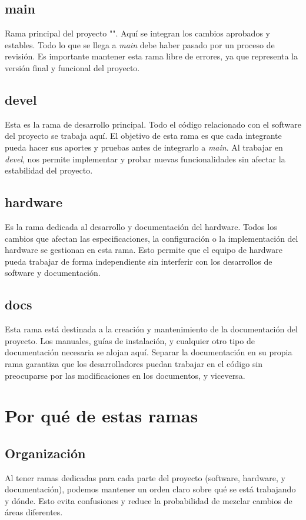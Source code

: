 \documentclass[a4paper]{article}
\begin{document}
    \subsection{main}
        \indent Rama principal del proyecto "". Aquí se integran los cambios aprobados y estables. Todo lo que se llega a \textit{main} debe haber pasado por un proceso de revisión. Es importante mantener esta rama libre de errores, ya que representa la versión final y funcional del proyecto.

    \subsection{devel}
        \indent Esta es la rama de desarrollo principal. Todo el código relacionado con el software del proyecto se trabaja aquí. El objetivo de esta rama es que cada integrante pueda hacer sus aportes y pruebas antes de integrarlo a \textit{main}. Al trabajar en \textit{devel}, nos permite implementar y probar nuevas funcionalidades sin afectar la estabilidad del proyecto.

    \subsection{hardware}
        \indent Es la rama dedicada al desarrollo y documentación del hardware. Todos los cambios que afectan las especificaciones, la configuración o la implementación del hardware se gestionan en esta rama. Esto permite que el equipo de hardware pueda trabajar de forma independiente sin interferir con los desarrollos de software y documentación.

    \subsection{docs}
        \indent Esta rama está destinada a la creación y mantenimiento de la documentación del proyecto. Los manuales, guías de instalación, y cualquier otro tipo de documentación necesaria se alojan aquí. Separar la documentación en su propia rama garantiza que los desarrolladores puedan trabajar en el código sin preocuparse por las modificaciones en los documentos, y viceversa.

\section{Por qué de estas ramas}

    \subsection{Organización}
    \indent Al tener ramas dedicadas para cada parte del proyecto (software, hardware, y documentación), podemos mantener un orden claro sobre qué se está trabajando y dónde. Esto evita confusiones y reduce la probabilidad de mezclar cambios de áreas diferentes.
\end{document}
